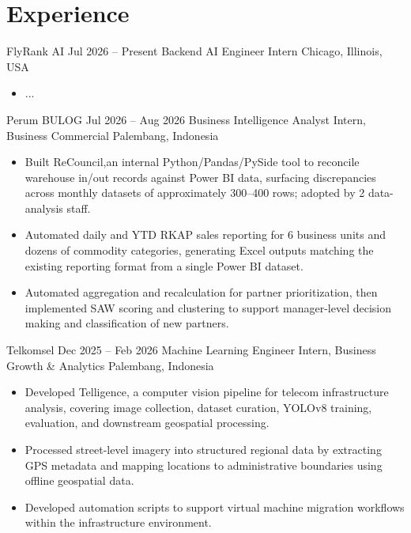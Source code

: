 \section*{Experience}

\experience
{FlyRank AI}
{Jul 2026 -- Present}
{Backend AI Engineer Intern}
{Chicago, Illinois, USA}

\begin{itemize}
    \item ...
\end{itemize}

\vspace{4pt}

\experience
{Perum BULOG}
{Jul 2026 -- Aug 2026}
{Business Intelligence Analyst Intern, Business Commercial}
{Palembang, Indonesia}

\begin{itemize}
    \item Built ReCouncil,an internal Python/Pandas/PySide tool to reconcile
    warehouse in/out records against Power BI data, surfacing
    discrepancies across monthly datasets of approximately 300--400
    rows; adopted by 2 data-analysis staff.
    
    \item Automated daily and YTD RKAP sales reporting for 6 business
    units and dozens of commodity categories, generating Excel outputs
    matching the existing reporting format from a single Power BI
    dataset.
    
    \item Automated aggregation and recalculation for partner
    prioritization, then implemented SAW scoring and clustering to
    support manager-level decision making and classification of new
    partners.
\end{itemize}

\vspace{4pt}

\experience
{Telkomsel}
{Dec 2025 -- Feb 2026}
{Machine Learning Engineer Intern, Business Growth \& Analytics}
{Palembang, Indonesia}

\begin{itemize}
    \item Developed Telligence, a computer vision pipeline for telecom infrastructure
    analysis, covering image collection, dataset curation, YOLOv8
    training, evaluation, and downstream geospatial processing.

    \item Processed street-level imagery into structured regional data
    by extracting GPS metadata and mapping locations to administrative
    boundaries using offline geospatial data.

    \item Developed automation scripts to support virtual machine
    migration workflows within the infrastructure environment.
\end{itemize}